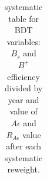 \begin{table}
\begin{tabular}{|c|c c|c c|c c|c|c|c|c|c|c|}
    \end{tabular}
    \caption{systematic table for BDT variables: $B_s$ and $B^+$ efficiency divided by year and value of $A \epsilon$ and $R_{A \epsilon}$ value after each systematic reweight.}
    \label{table::BDT variables syst}
\end{table}







